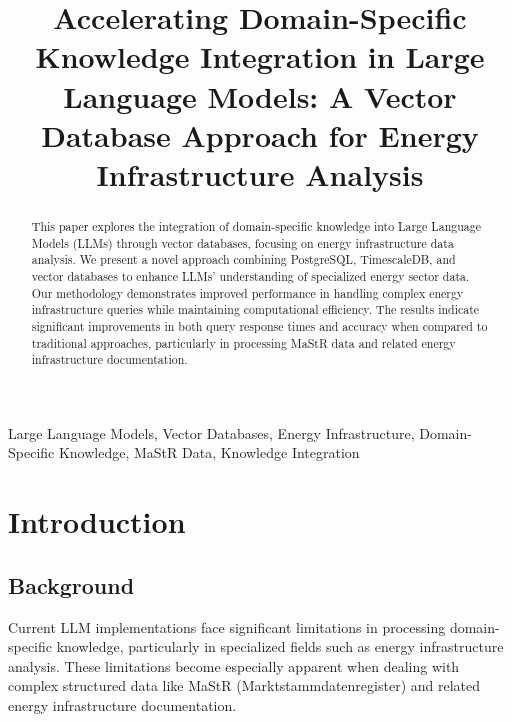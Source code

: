 \documentclass[conference]{IEEEtran}
\begin{document}
\title{Accelerating Domain-Specific Knowledge Integration in Large Language Models: A Vector Database Approach for Energy Infrastructure Analysis}

\author{
}

\maketitle

\begin{abstract}
This paper explores the integration of domain-specific knowledge into Large Language Models (LLMs) through vector databases, focusing on energy infrastructure data analysis. We present a novel approach combining PostgreSQL, TimescaleDB, and vector databases to enhance LLMs' understanding of specialized energy sector data. Our methodology demonstrates improved performance in handling complex energy infrastructure queries while maintaining computational efficiency. The results indicate significant improvements in both query response times and accuracy when compared to traditional approaches, particularly in processing MaStR data and related energy infrastructure documentation.
\end{abstract}

\begin{IEEEkeywords}
Large Language Models, Vector Databases, Energy Infrastructure, Domain-Specific Knowledge, MaStR Data, Knowledge Integration
\end{IEEEkeywords}

\section{Introduction}
\subsection{Background}
Current LLM implementations face significant limitations in processing domain-specific knowledge, particularly in specialized fields such as energy infrastructure analysis. These limitations become especially apparent when dealing with complex structured data like MaStR (Marktstammdatenregister) and related energy infrastructure documentation.
\end{document}
